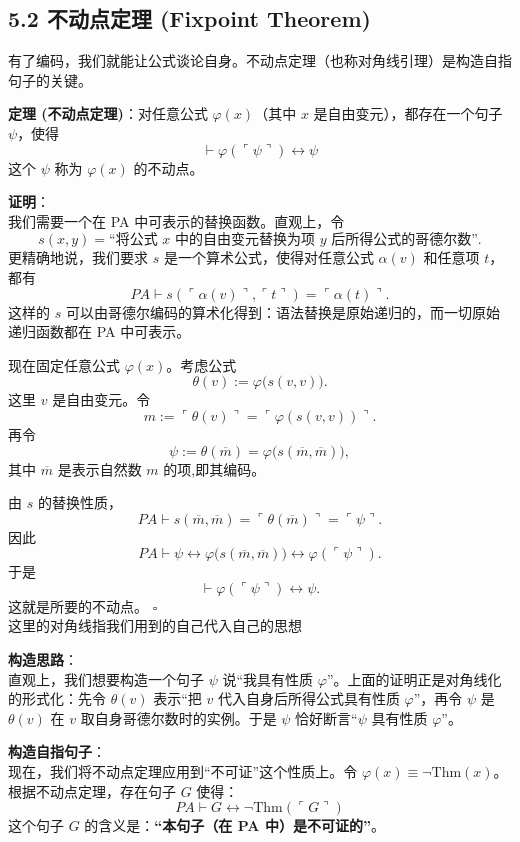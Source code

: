 \documentclass[12pt, a4paper]{article}
\begin{document}
\subsection*{5.2 不动点定理 (Fixpoint Theorem)}

有了编码，我们就能让公式谈论自身。不动点定理（也称对角线引理）是构造自指句子的关键。

\begin{mdframed}
    \textbf{定理 (不动点定理)}：对任意公式 \(\varphi(x)\)（其中 \(x\) 是自由变元），都存在一个句子 \(\psi\)，使得
    \[
    \vdash \varphi(\ulcorner \psi \urcorner) \leftrightarrow \psi
    \]
    这个 \(\psi\) 称为 \(\varphi(x)\) 的不动点。
\end{mdframed}

\textbf{证明}：\\
我们需要一个在 PA 中可表示的替换函数。直观上，令
\[
s(x,y)=\text{“将公式 }x\text{ 中的自由变元替换为项 }y\text{ 后所得公式的哥德尔数”}.
\]
更精确地说，我们要求 \(s\) 是一个算术公式，使得对任意公式 \(\alpha(v)\) 和任意项 \(t\)，都有
\[
PA \vdash s(\ulcorner \alpha(v)\urcorner,\ulcorner t\urcorner)=\ulcorner \alpha(t)\urcorner .
\]
这样的 \(s\) 可以由哥德尔编码的算术化得到：语法替换是原始递归的，而一切原始递归函数都在 PA 中可表示。

现在固定任意公式 \(\varphi(x)\)。考虑公式
\[
\theta(v):=\varphi\bigl(s(v,v)\bigr).
\]
这里 \(v\) 是自由变元。令
\[
m:=\ulcorner \theta(v)\urcorner=\ulcorner \varphi(s(v,v))\urcorner .
\]
再令
\[
\psi:=\theta(\overline{m})=\varphi\bigl(s(\overline{m},\overline{m})\bigr),
\]
其中 \(\overline{m}\) 是表示自然数 \(m\) 的项,即其编码。

由 \(s\) 的替换性质，
\[
PA \vdash s(\overline{m},\overline{m})
=\ulcorner \theta(\overline{m})\urcorner
=\ulcorner \psi\urcorner .
\]
因此
\[
PA \vdash \psi
\leftrightarrow \varphi\bigl(s(\overline{m},\overline{m})\bigr)
\leftrightarrow \varphi(\ulcorner \psi\urcorner).
\]
于是
\[
\vdash \varphi(\ulcorner \psi\urcorner)\leftrightarrow \psi .
\]
这就是所要的不动点。 \hfill \(\square\) \\
这里的对角线指我们用到的自己代入自己的思想

\textbf{构造思路}：\\
直观上，我们想要构造一个句子 \(\psi\) 说“我具有性质 \(\varphi\)”。上面的证明正是对角线化的形式化：先令 \(\theta(v)\) 表示“把 \(v\) 代入自身后所得公式具有性质 \(\varphi\)”，再令 \(\psi\) 是 \(\theta(v)\) 在 \(v\) 取自身哥德尔数时的实例。于是 \(\psi\) 恰好断言“\(\psi\) 具有性质 \(\varphi\)”。

\textbf{构造自指句子}：\\
现在，我们将不动点定理应用到“不可证”这个性质上。令 \(\varphi(x) \equiv \neg \text{Thm}(x)\)。根据不动点定理，存在句子 \(G\) 使得：
\[
PA \vdash G \leftrightarrow \neg \text{Thm}(\ulcorner G \urcorner)
\]
这个句子 \(G\) 的含义是：\textbf{“本句子（在 PA 中）是不可证的”}。
\end{document}
